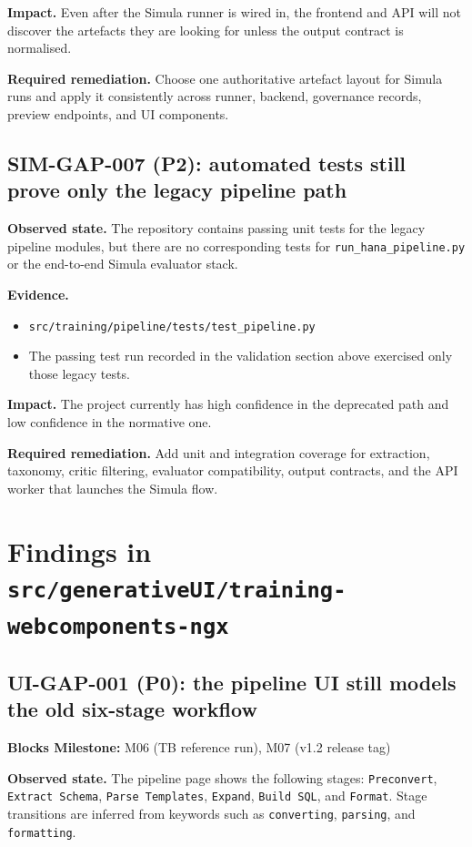 \textbf{Impact.}
Even after the Simula runner is wired in, the frontend and API will
not discover the artefacts they are looking for unless the output
contract is normalised.

\textbf{Required remediation.}
Choose one authoritative artefact layout for Simula runs and apply it
consistently across runner, backend, governance records, preview
endpoints, and UI components.

\subsection*{SIM-GAP-007 (P2): automated tests still prove only the legacy pipeline path}
\textbf{Observed state.}
The repository contains passing unit tests for the legacy pipeline
modules, but there are no corresponding tests for
\texttt{run\_hana\_pipeline.py} or the end-to-end Simula evaluator
stack.

\textbf{Evidence.}
\begin{itemize}
  \item \texttt{src/training/pipeline/tests/test\_pipeline.py}
  \item The passing test run recorded in the validation section above
    exercised only those legacy tests.
\end{itemize}

\textbf{Impact.}
The project currently has high confidence in the deprecated path and
low confidence in the normative one.

\textbf{Required remediation.}
Add unit and integration coverage for extraction, taxonomy, critic
filtering, evaluator compatibility, output contracts, and the API
worker that launches the Simula flow.

\section{Findings in \texttt{src/generativeUI/training-webcomponents-ngx}}

\subsection*{UI-GAP-001 (P0): the pipeline UI still models the old six-stage workflow}
\label{gap:ui-001}
\textbf{Blocks Milestone:} M06 (TB reference run), M07 (v1.2 release tag)

\textbf{Observed state.}
The pipeline page shows the following stages:
\texttt{Preconvert}, \texttt{Extract Schema}, \texttt{Parse
Templates}, \texttt{Expand}, \texttt{Build SQL}, and
\texttt{Format}. Stage transitions are inferred from keywords such as
\texttt{converting}, \texttt{parsing}, and \texttt{formatting}.

